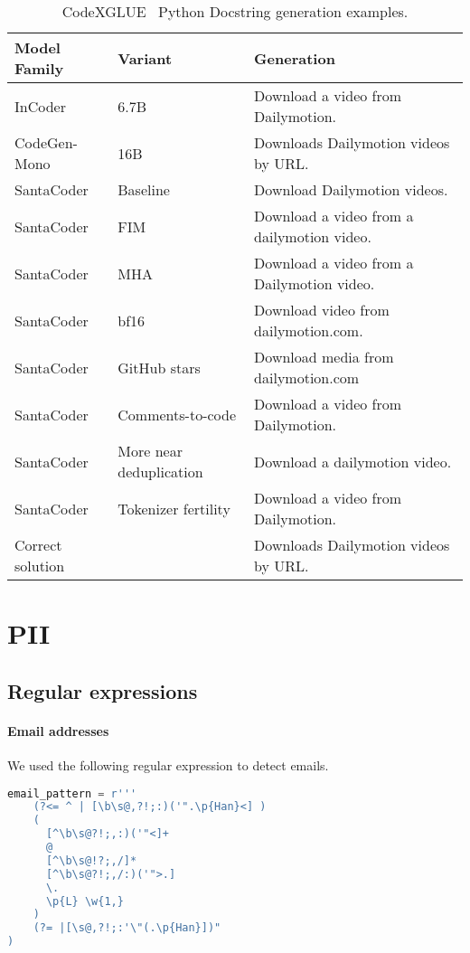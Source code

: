 \documentclass[10pt]{article} \usepackage{iclr2023_conference,times}
\begin{document}
\begin{table}[t]
\centering
\begin{tabular}{lll}
\toprule
Model Family & Variant & Generation\\
\midrule
InCoder & 6.7B & Download a video from Dailymotion.\\
CodeGen-Mono & 16B & Downloads Dailymotion videos by URL.\\
\midrule
SantaCoder & Baseline & Download Dailymotion videos.\\
SantaCoder & FIM & Download a video from a dailymotion video.\\
SantaCoder & MHA & Download a video from a Dailymotion video.\\
SantaCoder & bf16 & Download video from dailymotion.com.\\
\midrule
SantaCoder & GitHub stars & Download media from dailymotion.com\\
SantaCoder & Comments-to-code & Download a video from Dailymotion.\\
SantaCoder & More near deduplication & Download a dailymotion video.\\
SantaCoder & Tokenizer fertility & Download a video from Dailymotion.\\
\midrule
Correct solution & & Downloads Dailymotion videos by URL.\\
\bottomrule
\end{tabular}
\caption{CodeXGLUE~\citep{lu2021codexglue} Python Docstring generation examples.}
\label{tab:codexgluegen}
\end{table}




\newpage
\section{PII}\label{sec:pii}
\subsection{Regular expressions}
\label{sec:pii_regex}
\paragraph{Email addresses} We used the following regular expression to detect emails. 
\begin{lstlisting}[language=python] 
email_pattern = r'''
    (?<= ^ | [\b\s@,?!;:)('".\p{Han}<] )
    (
      [^\b\s@?!;,:)('"<]+
      @
      [^\b\s@!?;,/]*
      [^\b\s@?!;,/:)('">.]
      \.
      \p{L} \w{1,}
    )
    (?= |[\s@,?!;:'\"(.\p{Han}])"
)
\end{lstlisting}
\end{document}
